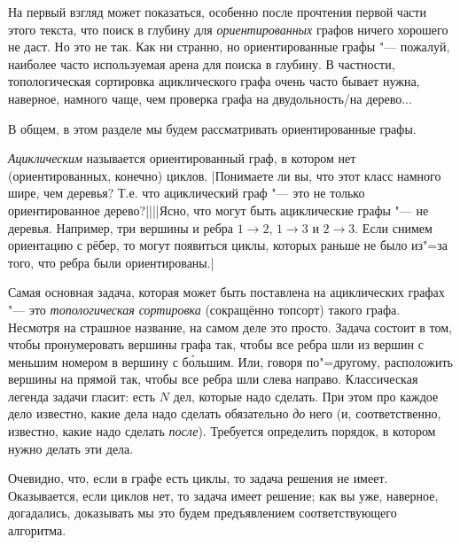 

На первый взгляд может показаться, особенно после прочтения первой части этого текста, что поиск в 
глубину для \textit{ориентированных} графов ничего хорошего не даст. Но это не так. 
Как ни странно, но ориентированные графы "--- пожалуй, наиболее часто используемая арена для поиска 
в глубину. В частности, топологическая сортировка ациклического графа очень часто бывает нужна, 
наверное, намного чаще, чем проверка графа на двудольность/на дерево...

В общем, в этом разделе мы будем рассматривать ориентированные графы.

\textit{Ациклическим} называется ориентированный граф, в котором нет (ориентированных, конечно) 
циклов. 
|Понимаете ли вы, что этот класс намного шире, чем деревья? Т.е.
что ациклический граф "--- это не только ориентированное дерево?||||Ясно, что могут быть ациклические графы "--- не деревья. Например, три вершины и 
ребра $1\to 2$, $1\to 3$ и $2\to 3$. Если снимем ориентацию с рёбер, то могут появиться циклы,
которых раньше не было из"=за того, что ребра были ориентированы.|\label{acyclicnontree}

Самая основная задача, которая может быть поставлена на ациклических графах "--- это 
\textit{топологическая сортировка} (сокращённо топсорт) такого графа. Несмотря на страшное 
название, на самом деле это 
просто. Задача состоит в том, чтобы пронумеровать вершины графа так, чтобы все ребра шли из вершин 
с меньшим номером в вершину с б\'{о}льшим. Или, говоря по"=другому, расположить вершины на прямой 
так, чтобы все ребра шли слева направо. Классическая легенда задачи гласит: есть $N$ дел, которые 
надо сделать. При этом про каждое дело известно, какие дела надо сделать обязательно \textit{до} 
него (и, соответственно, известно, какие надо сделать \textit{после}). Требуется определить 
порядок, в котором нужно делать эти дела.

Очевидно, что, если в графе есть циклы, то задача решения не имеет. Оказывается, если циклов нет, 
то задача имеет решение; как вы уже, наверное, догадались, доказывать мы это будем предъявлением 
соответствующего алгоритма.


